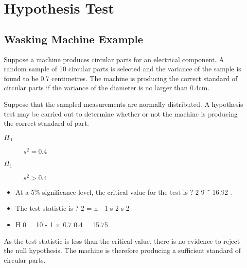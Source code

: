 
	\section{Hypothesis Test}
	\subsection{Wasking Machine Example}%
	Suppose a machine produces circular parts for an electrical component. A random sample of 10 circular parts is selected and the variance of the sample is found to be 0.7 centimetres. The machine is producing the correct standard of circular parts if the variance of the diameter is no larger than 0.4cm.
	
	Suppose that the sampled measurements are normally distributed. A hypothesis test may be carried out to determine whether or not the machine is producing the correct standard of part.
	
	\begin{description}
		\item[$H_0$] $s^2=0.4$
		\item[$H_1$] $s^2>0.4$
	\end{description} 
	
	\begin{itemize}
		\item At a 5\% significance level, the critical value for the test is ? 2 9 ˜ 16.92 . 
		\item The test statistic is ? 2 = n - 1 s 2 s 2 
		\item H 0 = 10 - 1 × 0.7 0.4 = 15.75 .
	\end{itemize}
	
	
	
	
	As the test statistic is less than the critical value, there is no evidence to reject the null hypothesis. The machine is therefore producing a sufficient standard of circular parts.